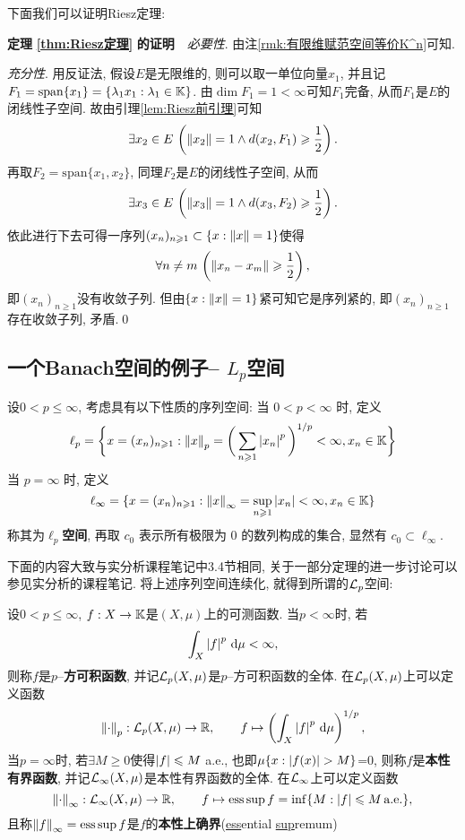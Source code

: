 下面我们可以证明Riesz定理:

\textbf{定理\,\,\ref{thm:Riesz定理}\,\,的证明}\ \ \textsl{必要性}. 由注\ref{rmk:有限维赋范空间等价K^n}可知.

\textsl{充分性}. 用反证法, 假设$ E $是无限维的, 则可以取一单位向量$ x_1 $, 并且记$ F_1=\mathrm{span}\{x_1\}=\{ \lambda_1x_1 : \lambda_1\in\mathbb{K} \} $. 由$ \dim F_1=1<\infty $可知$ F_1 $完备, 从而$ F_1 $是$ E $的闭线性子空间. 故由引理\ref{lem:Riesz前引理}可知
\[
	\exists x_2\in E\,\left(\left\| x_2 \right\|=1\land d(x_2,F_1)\geqslant\frac{1}{2}\right).
\]
再取$ F_2=\mathrm{span}\{x_1,x_2\} $, 同理$ F_2 $是$ E $的闭线性子空间, 从而
\[
	\exists x_3\in E\,\left(\left\| x_3 \right\|=1\land d(x_3,F_2)\geqslant\frac{1}{2}\right).
\]
依此进行下去可得一序列$ (x_n)_{n\geqslant 1}\subset\{ x : \left\| x \right\|=1 \} $使得
\[
	\forall n\ne m\,\left(\left\| x_n-x_m \right\|\geqslant\frac{1}{2}\right),
\]
即$ (x_n)_{n\geqslant 1} $没有收敛子列. 但由$ \{ x : \left\| x \right\|=1 \} $紧可知它是序列紧的, 即$ (x_n)_{n\geqslant 1} $存在收敛子列, 矛盾.\qed

\subsection{一个Banach空间的例子-- $ L_p $空间}

\begin{Definition}[$ \ell_{p} $空间]\label{def:lp空间}
	设$ 0<p\leqslant\infty $, 考虑具有以下性质的序列空间:
	当 $ 0<p<\infty $ 时, 定义
	\[
		\ell_{p}=\bigg\{ x=(x_{n})_{n\geqslant1}: \left\| x \right\|_{p}=\bigg( \sum\limits_{n\geqslant1}\left| x_{n} \right| ^{p} \bigg)^{1/p}<\infty, x_{n}\in\mathbb{K} \bigg\}
	\]
	当 $ p=\infty $ 时, 定义
	\[
		\ell_{\infty}=\{ x=(x_{n})_{n\geqslant1}:\left\| x \right\|_{\infty}=\sup_{n\geqslant1}\left| x_{n} \right| <\infty, x_{n}\in\mathbb{K} \}
	\]
	称其为\textbf{$ \ell_{p} $空间}, 再取 $ c_{0} $ 表示所有极限为 $ 0 $ 的数列构成的集合, 显然有 $ c_{0}\subset\ell_{\infty} $.
\end{Definition}

下面的内容大致与实分析课程笔记中3.4节相同, 关于一部分定理的进一步讨论可以参见实分析的课程笔记. 将上述序列空间连续化, 就得到所谓的$ \CL_p $空间:

\begin{Definition}[$ \CL_p $空间]\label{def:Lp空间}
	设$ 0<p\leqslant\infty $, $ f : X\to\mathbb{K} $是$ (X,\mu) $上的可测函数. 当$ p<\infty $时, 若
	\[
		\int_X\left| f \right| ^p\,\mathrm{d}\mu<\infty,
	\]
	则称$ f $是$ p $--\textbf{方可积函数}, 并记$ \mathcal{L}_p(X,\mu) $是$ p $--方可积函数的全体. 在$ \mathcal{L}_p(X,\mu) $上可以定义函数
	\[
		\left\| \cdot \right\|_p : \mathcal{L}_p(X,\mu)\to\mathbb{R},\qquad f\mapsto\left(\int_X\left| f \right| ^p\,\mathrm{d}\mu\right)^{1/p},
	\]
	当$ p=\infty $时, 若$ \exists M\geqslant 0 $使得$ \left| f \right| \leqslant M $ a.e., 也即$ \mu\{ x : \left| f(x) \right| >M \} $=0, 则称$ f $是\textbf{本性有界函数}, 并记$ \mathcal{L}_\infty(X,\mu) $是本性有界函数的全体. 在$ \mathcal{L}_\infty $上可以定义函数
	\[
		\left\| \cdot \right\|_\infty : \mathcal{L}_\infty(X,\mu)\to\mathbb{R},\qquad f\mapsto\operatorname{ess\,sup} f=\inf\{ M : \left| f \right| \leqslant M \text{\,a.e.} \},
	\]
	且称$ \left\| f \right\|_\infty=\operatorname{ess\,sup} f $是$ f $的\textbf{本性上确界}(\underline{ess}ential \underline{sup}remum)
\end{Definition}

